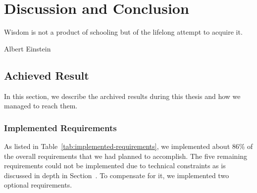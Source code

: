 \chapter{Discussion and Conclusion}
\epigraph{Wisdom is not a product of schooling but of the lifelong attempt to acquire it.}{Albert Einstein}
\section{Achieved Result}

In this section, we describe the archived results during this thesis and how we managed to reach them.

\subsection{Implemented Requirements}

As listed in Table~\ref{tab:implemented-requirements}, we implemented about 86\% of the overall requirements that we had planned to accomplish. The five remaining requirements could not be implemented due to technical constraints as is discussed in depth in Section~. To compensate for it, we implemented two optional requirements.

